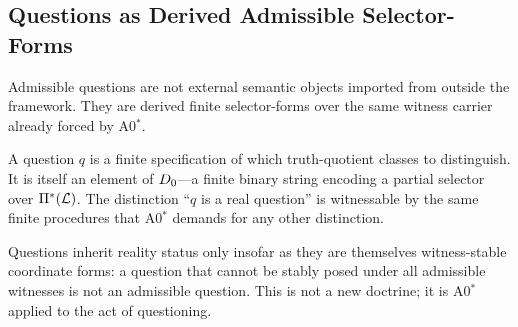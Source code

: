 \subsection{Questions as Derived Admissible Selector-Forms}
\label{sec:axioms:questions}

Admissible questions are not external semantic objects imported from
outside the framework.  They are derived finite selector-forms over the
same witness carrier already forced by A0$^*$.

A question $q$ is a finite specification of which truth-quotient classes
to distinguish.  It is itself an element of $D_0$---a finite binary
string encoding a partial selector over $\Pi^*(\mathcal{L})$.  The distinction
``$q$ is a real question'' is witnessable by the same finite procedures
that A0$^*$ demands for any other distinction.

Questions inherit reality status only insofar as they are themselves
witness-stable coordinate forms: a question that cannot be stably posed
under all admissible witnesses is not an admissible question.  This is
not a new doctrine; it is A0$^*$ applied to the act of questioning.
